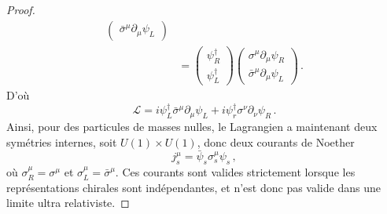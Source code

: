 \documentclass{article}
\numberwithin{equation}{section}
\theoremstyle{solution}
\begin{document}
\begin{proof}
\begin{align*}
\begin{pmatrix}
                 \bar{\sigma}^{\mu}\partial_\mu \psi_L 
         \end{pmatrix} \\
         &= 
        \begin{pmatrix}
                \psi_R^{\dagger} \\
                \psi_L^{\dagger}
        \end{pmatrix}
         \begin{pmatrix}
                 \sigma^{\mu} \partial_\mu \psi_R \\[1ex]
                 \bar{\sigma}^{\mu}\partial_\mu \psi_L 
         \end{pmatrix} \, .
\end{align*}
D'où
\begin{equation}
        \mathcal{L} = i \psi_L^{\dagger} \bar{\sigma}^{\mu} \partial_\mu \psi_L + i \psi_r^{\dagger} \sigma^{\nu}\partial_\nu \psi_R \, .
\end{equation}
Ainsi, pour des particules de masses nulles, le Lagrangien a maintenant deux symétries internes, soit $U(1)\times U(1)$, donc deux 
courants de Noether
\begin{equation}
        \boxed{j^{\mu}_s = \bar{\psi}_s \sigma^{\mu}_s \psi_s}\, ,
\end{equation} 
où $\sigma^{\mu}_R = \sigma^{\mu}$ et $\sigma^{\mu}_L = \bar{\sigma}^{\mu}$. Ces courants sont valides strictement lorsque les représentations chirales 
sont indépendantes, et n'est donc pas valide dans une limite ultra relativiste. 


\end{proof}
\end{document}
